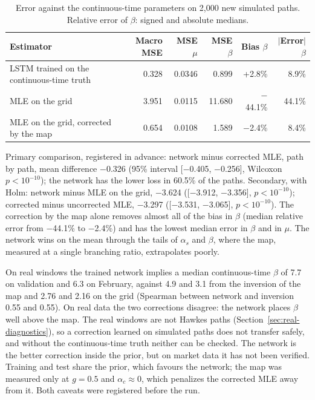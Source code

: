 \begin{table}[htbp]
\centering
\caption{Error against the continuous-time parameters on 2,000 new
simulated paths. Relative error of $\beta$: signed and absolute medians.}
\label{tab:addendum-grid-correction}
\footnotesize
\begin{tabular}{lrrrrr}
\toprule
Estimator & Macro MSE & MSE $\mu$ & MSE $\beta$ & Bias $\beta$ & $|$Error$|$ $\beta$ \\
\midrule
LSTM trained on the continuous-time truth & 0.328 & 0.0346 & 0.899 & +2.8\% & 8.9\% \\
MLE on the grid & 3.951 & 0.0115 & 11.680 & $-$44.1\% & 44.1\% \\
MLE on the grid, corrected by the map & 0.654 & 0.0108 & 1.589 & $-$2.4\% & 8.4\% \\
\bottomrule
\end{tabular}
\end{table}

Primary comparison, registered in advance: network minus corrected MLE, path by path, mean
difference $-$0.326 (95\% interval
[$-$0.405, $-$0.256], Wilcoxon $p<10^{-10}$); the network has the lower loss
in 60.5\% of the paths. Secondary, with Holm: network minus MLE on the
grid, $-$3.624 ([$-$3.912, $-$3.356],
$p<10^{-10}$);
corrected minus uncorrected MLE, $-$3.297
([$-$3.531, $-$3.065], $p<10^{-10}$).
The correction by the map alone removes almost all of the bias in $\beta$ (median relative
error from $-$44.1\% to
$-$2.4\%) and has the lowest median error in
$\beta$ and in $\mu$. The network wins on the mean through the tails of $\alpha_s$ and
$\beta$, where the map, measured at a single branching ratio, extrapolates poorly.

On real windows the trained network implies a median continuous-time $\beta$ of
7.7 on validation and
6.3 on February, against
4.9 and 3.1
from the inversion of the map and 2.76 and
2.16 on the grid (Spearman between network and
inversion 0.55 and
0.55). On real data the two corrections
disagree: the network places $\beta$ well above the map. The real windows are not Hawkes
paths (Section~\ref{sec:real-diagnostics}), so a correction learned on simulated paths does
not transfer safely, and without the continuous-time truth neither can be checked. The network is
the better correction inside the prior, but on market data it has not been verified. Training
and test share the prior, which
favours the network; the map was measured only at $g=0.5$ and $\alpha_c\approx0$, which
penalizes the corrected MLE away from it. Both caveats were registered before the run.


